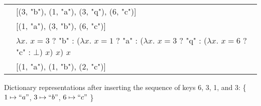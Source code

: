 \begin{teaserfigure}
\centering
\newcommand{\lameq}[1]{$\lambda x$. $x = {#1}$}
\begin{tabular}{ l l }
 \Sal{} & [(3, "b"), (1, "a"), {\color{gray} (3, "q")}, (6, "c")] \\
 \Cal{} & [(1, "a"), (3, "b"), (6, "c")] \\ %
 \Fpf{} & \lameq{3} ? "b" : (\lameq{1} ? "a" : (\lameq{3} ? {\color{gray} "q"} : (\lameq{6} ? "c" : $\bot$) $x$) $x$) $x$ \\
 \Dd{}  & [(1, "a"), (1, "b"), (2, "c")]
\end{tabular}
%
%
\caption{Dictionary representations after inserting the sequence of keys 6, 3, 1, and 3:
\{ $1 \mapsto ``a"$, $3 \mapsto ``b"$, $6 \mapsto ``c"$ \}
}
%
\label{fig:intro-example}
\vspace{0.15in} %
\end{teaserfigure}
